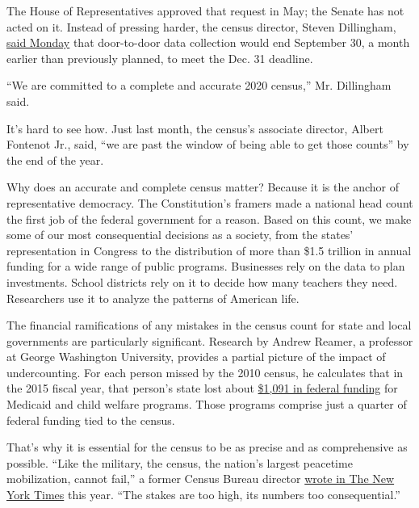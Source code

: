The House of Representatives approved that request in May; the Senate
has not acted on it. Instead of pressing harder, the census director,
Steven Dillingham,
\href{https://www.census.gov/newsroom/press-releases/2020/delivering-complete-accurate-count.html}{said
Monday} that door-to-door data collection would end September 30, a
month earlier than previously planned, to meet the Dec. 31 deadline.

``We are committed to a complete and accurate 2020 census,'' Mr.
Dillingham said.

It's hard to see how. Just last month, the census's associate director,
Albert Fontenot Jr., said, ``we are past the window of being able to get
those counts'' by the end of the year.

Why does an accurate and complete census matter? Because it is the
anchor of representative democracy. The Constitution's framers made a
national head count the first job of the federal government for a
reason. Based on this count, we make some of our most consequential
decisions as a society, from the states' representation in Congress to
the distribution of more than \$1.5 trillion in annual funding for a
wide range of public programs. Businesses rely on the data to plan
investments. School districts rely on it to decide how many teachers
they need. Researchers use it to analyze the patterns of American life.

The financial ramifications of any mistakes in the census count for
state and local governments are particularly significant. Research by
Andrew Reamer, a professor at George Washington University, provides a
partial picture of the impact of undercounting. For each person missed
by the 2010 census, he calculates that in the 2015 fiscal year, that
person's state lost about
\href{https://gwipp.gwu.edu/sites/g/files/zaxdzs2181/f/downloads/GWIPP\%20Reamer\%20Fiscal\%20Impacts\%20of\%20Census\%20Undercount\%20on\%20FMAP-based\%20Programs\%2003-19-18.pdf}{\$1,091
in federal funding} for Medicaid and child welfare programs. Those
programs comprise just a quarter of federal funding tied to the census.

That's why it is essential for the census to be as precise and as
comprehensive as possible. ``Like the military, the census, the nation's
largest peacetime mobilization, cannot fail,'' a former Census Bureau
director
\href{https://www.nytimes.com/2020/03/11/opinion/contributors/census-coronavirus.html}{wrote
in The New York Times} this year. ``The stakes are too high, its numbers
too consequential.''

